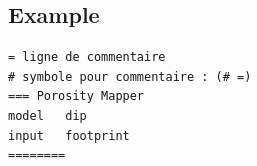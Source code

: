 \subsection{Example}
\begin{verbatim}
= ligne de commentaire
# symbole pour commentaire : (# =)
=== Porosity Mapper
model	dip
input	footprint
========
\end{verbatim}

